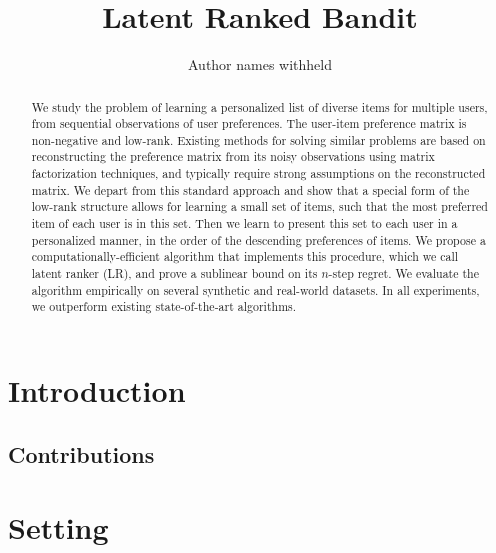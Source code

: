 \documentclass[letterpaper]{article} %
\begin{document}
%
\title{Latent Ranked Bandit}
\author{Author names withheld}
\maketitle
\begin{abstract}
We study the problem of learning a personalized list of diverse items for multiple users, from sequential observations of user preferences. The user-item preference matrix is non-negative and low-rank. Existing methods for solving similar problems are based on reconstructing the preference matrix from its noisy observations using matrix factorization techniques, and typically require strong assumptions on the reconstructed matrix. We depart from this standard approach and show that a special form of the low-rank structure allows for learning a small set of items, such that the most preferred item of each user is in this set. Then we learn to present this set to each user in a personalized manner, in the order of the descending preferences of items. We propose a computationally-efficient algorithm that implements this procedure, which we call latent ranker (LR), and prove a sublinear bound on its $n$-step regret. We evaluate the algorithm empirically on several synthetic and real-world datasets. In all experiments, we outperform existing state-of-the-art algorithms. 
\end{abstract}

\section{Introduction}
\label{intro}

\subsection{Contributions}
\label{Contribution}



\section{Setting}
\label{probdef}

\end{document}
